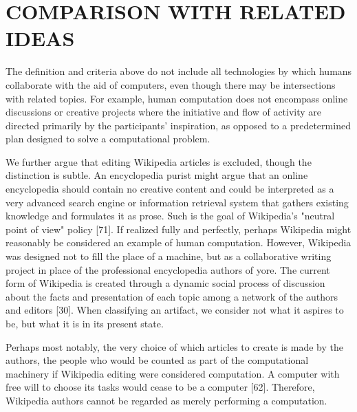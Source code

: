 \documentclass{acm_proc_article-sp}
\begin{document}
\section*{COMPARISON WITH RELATED IDEAS}
The definition and criteria above do not include all technologies by which humans collaborate with the aid of computers, even though there may be intersections with related topics. For example, human computation does not encompass online discussions or creative projects where the initiative and flow of activity are directed primarily by the participants' inspiration, as opposed to a predetermined plan designed to solve a computational problem.

We further argue that editing Wikipedia articles is excluded, though the distinction is subtle. An encyclopedia purist might argue that an online encyclopedia should contain no creative content and could be interpreted as a very advanced search engine or information retrieval system that gathers existing knowledge and formulates it as prose. Such is the goal of Wikipedia's "neutral point of view" policy [71]. If realized fully and perfectly, perhaps Wikipedia might reasonably be considered an example of human computation. However, Wikipedia was designed not to fill the place of a machine, but as a collaborative writing project in place of the professional encyclopedia authors of yore. The current form of Wikipedia is created through a dynamic social process of discussion about the facts and presentation of each topic among a network of the authors and editors [30]. When classifying an artifact, we consider not what it aspires to be, but what it is in its present state.

Perhaps most notably, the very choice of which articles to create is made by the authors, the people who would be counted as part of the computational machinery if Wikipedia editing were considered computation. A computer with free will to choose its tasks would cease to be a computer [62]. Therefore, Wikipedia authors cannot be regarded as merely performing a computation.
\end{document}
